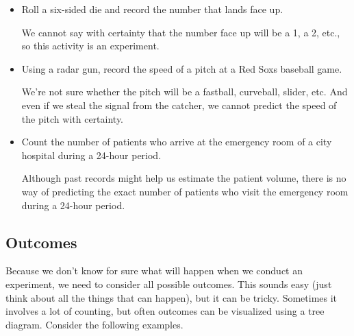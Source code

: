 \documentclass{report}
\begin{document}
\begin{itemize}
  \item Roll a six-sided die and record the number that lands face up. 
    \vspace{2mm}

  \subitem We cannot say with certainty that the number face up will be a 1, a 2, etc., so this activity is an experiment.
  \item Using a radar gun, record the speed of a pitch at a Red Soxs baseball game.
    \vspace{2mm}

    \subitem We're not sure whether the pitch will be a fastball, curveball, slider, etc. And even if we steal the signal from the catcher, we cannot predict the speed of the pitch with certainty.
  \item Count the number of patients who arrive at the emergency room of a city hospital during a 24-hour period.
  \vspace{.5mm}

    \subitem Although past records might help us estimate the patient volume, there is no way of predicting the exact number of patients who visit the emergency room during a 24-hour period.
\end{itemize}
\bigbreak \noindnet
\subsection*{Outcomes}
Because we don't know for sure what will happen when we conduct an experiment, we need to consider all possible outcomes. This sounds easy (just think about all the things that can happen), but it can be tricky. Sometimes it involves a lot of counting, but often outcomes can be visualized using a tree diagram. Consider the following examples.
\bigbreak \noindnet
{}
\pagebreak
\end{document}
